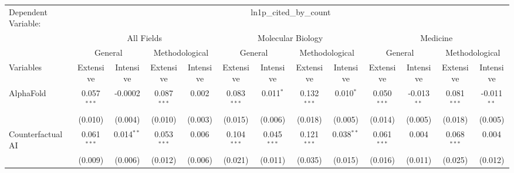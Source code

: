 \begingroup
\centering
\begin{tabular}{lcccccccccccc}
   \tabularnewline \midrule \midrule
   Dependent Variable: & \multicolumn{12}{c}{ln1p\_cited\_by\_count}\\
 & \multicolumn{4}{c}{All Fields} & \multicolumn{4}{c}{Molecular Biology} & \multicolumn{4}{c}{Medicine} \\
\cmidrule(lr){2-5} \cmidrule(lr){6-9} \cmidrule(lr){10-13}
 & \multicolumn{2}{c}{General} & \multicolumn{2}{c}{Methodological} & \multicolumn{2}{c}{General} & \multicolumn{2}{c}{Methodological} & \multicolumn{2}{c}{General} & \multicolumn{2}{c}{Methodological} \\
\cmidrule(lr){2-3} \cmidrule(lr){4-5} \cmidrule(lr){6-7} \cmidrule(lr){8-9} \cmidrule(lr){10-11} \cmidrule(lr){12-13}
Variables & \multicolumn{1}{c}{Extensive} & \multicolumn{1}{c}{Intensive} & \multicolumn{1}{c}{Extensive} & \multicolumn{1}{c}{Intensive} & \multicolumn{1}{c}{Extensive} & \multicolumn{1}{c}{Intensive} & \multicolumn{1}{c}{Extensive} & \multicolumn{1}{c}{Intensive} & \multicolumn{1}{c}{Extensive} & \multicolumn{1}{c}{Intensive} & \multicolumn{1}{c}{Extensive} & \multicolumn{1}{c}{Intensive} \\
\cmidrule(lr){1-1}\cmidrule(lr){2-2} \cmidrule(lr){3-3} \cmidrule(lr){4-4} \cmidrule(lr){5-5} \cmidrule(lr){6-6} \cmidrule(lr){7-7} \cmidrule(lr){8-8} \cmidrule(lr){9-9} \cmidrule(lr){10-10} \cmidrule(lr){11-11} \cmidrule(lr){12-12} \cmidrule(lr){13-13}
   AlphaFold                                & 0.057$^{***}$  & -0.0002        & 0.087$^{***}$  & 0.002          & 0.083$^{***}$  & 0.011$^{*}$   & 0.132$^{***}$ & 0.010$^{*}$  & 0.050$^{***}$  & -0.013$^{**}$ & 0.081$^{***}$ & -0.011$^{**}$\\   
                                            & (0.010)        & (0.004)        & (0.010)        & (0.003)        & (0.015)        & (0.006)       & (0.018)       & (0.005)      & (0.014)        & (0.005)       & (0.018)       & (0.005)\\   
   Counterfactual AI                        & 0.061$^{***}$  & 0.014$^{**}$   & 0.053$^{***}$  & 0.006          & 0.104$^{***}$  & 0.045$^{***}$ & 0.121$^{***}$ & 0.038$^{**}$ & 0.061$^{***}$  & 0.004         & 0.068$^{***}$ & 0.004\\   
                                            & (0.009)        & (0.006)        & (0.012)        & (0.006)        & (0.021)        & (0.011)       & (0.035)       & (0.015)      & (0.016)        & (0.011)       & (0.025)       & (0.012)\\   

\end{tabular}
